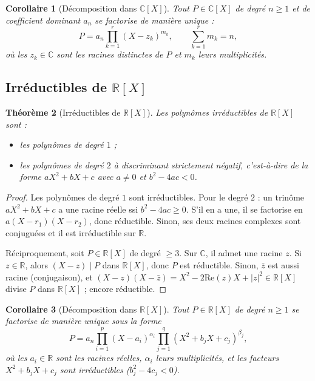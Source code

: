 \documentclass[12pt,a4paper]{report}
\newtheorem{theoreme}{Théorème}[section]
\newtheorem{corollaire}[theoreme]{Corollaire}
\theoremstyle{definition}
\theoremstyle{remark}
\begin{document}
\begin{corollaire}[{Décomposition dans $\mathbb{C}[X]$}]
Tout $P \in \mathbb{C}[X]$ de degré $n \ge 1$ et de coefficient dominant $a_n$ se factorise de manière unique :
\[ P = a_n \prod_{k=1}^{r} (X - z_k)^{m_k}, \qquad \sum_{k=1}^{r} m_k = n, \]
où les $z_k \in \mathbb{C}$ sont les racines distinctes de $P$ et $m_k$ leurs multiplicités.
\end{corollaire}

\subsection{Irréductibles de $\mathbb{R}[X]$}

\begin{theoreme}[{Irréductibles de $\mathbb{R}[X]$}]
Les polynômes irréductibles de $\mathbb{R}[X]$ sont :
\begin{itemize}
    \item les polynômes de degré $1$ ;
    \item les polynômes de degré $2$ à \emph{discriminant strictement négatif}, c'est-à-dire de la forme $aX^2 + bX + c$ avec $a \neq 0$ et $b^2 - 4ac < 0$.
\end{itemize}
\end{theoreme}

\begin{proof}
Les polynômes de degré $1$ sont irréductibles. Pour le degré $2$ : un trinôme $aX^2 + bX + c$ a une racine réelle ssi $b^2 - 4ac \ge 0$. S'il en a une, il se factorise en $a(X - r_1)(X - r_2)$, donc réductible. Sinon, ses deux racines complexes sont conjuguées et il est irréductible sur $\mathbb{R}$.

Réciproquement, soit $P \in \mathbb{R}[X]$ de degré $\ge 3$. Sur $\mathbb{C}$, il admet une racine $z$. Si $z \in \mathbb{R}$, alors $(X - z) \mid P$ dans $\mathbb{R}[X]$, donc $P$ est réductible. Sinon, $\bar{z}$ est aussi racine (conjugaison), et $(X - z)(X - \bar{z}) = X^2 - 2 \mathrm{Re}(z) X + |z|^2 \in \mathbb{R}[X]$ divise $P$ dans $\mathbb{R}[X]$ ; encore réductible.
\end{proof}

\begin{corollaire}[{Décomposition dans $\mathbb{R}[X]$}]
Tout $P \in \mathbb{R}[X]$ de degré $n \ge 1$ se factorise de manière unique sous la forme
\[ P = a_n \prod_{i=1}^{p} (X - a_i)^{\alpha_i} \prod_{j=1}^{q} (X^2 + b_j X + c_j)^{\beta_j}, \]
où les $a_i \in \mathbb{R}$ sont les racines réelles, $\alpha_i$ leurs multiplicités, et les facteurs $X^2 + b_j X + c_j$ sont irréductibles ($b_j^2 - 4 c_j < 0$).
\end{corollaire}
\end{document}
